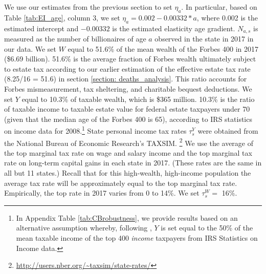 \documentclass[12pt]{article}
\begin{document}
We use our estimates from the previous section to set ${\eta_a}$. 
In particular, based on Table \ref{tab:EI_age}, column 3, we set ${\eta_a} = 0.002 - 0.00332*a $, where 0.002 is the estimated intercept and $-0.00332$ is the estimated elasticity age gradient. $N_{a,s}$ is measured as the number of billionaires of age $a$ observed in the state in 2017 in our data. 
We set $W$ equal to 51.6\% of the mean wealth of the Forbes 400 in 2017 (\$6.69 billion). 51.6\% is the average fraction of Forbes wealth ultimately subject to estate tax according to our earlier estimation of the effective estate tax rate (8.25/16 = 51.6) in section \ref{section: deaths_analysis}. This ratio accounts for Forbes mismeasurement, tax sheltering, and charitable bequest deductions. We set $Y$ equal to 10.3\% of taxable wealth, which is \$365 million. 10.3\% is the ratio of taxable income to taxable estate value for federal estate taxpayers under 70 (given that the median age of the Forbes 400 is 65), according to IRS statistics on income data for 2008.\footnote{In Appendix Table \ref{tab:CBrobustness}, we provide results based on an alternative assumption whereby, following \cite{saez-zucman:2019}, $Y$ is set equal to the 50\% of the mean taxable income of the top 400 \textit{income} taxpayers from IRS Statistics on Income data.} 
State personal income tax rates $\tau_s^{Y}$ were obtained from the National Bureau of Economic Research's TAXSIM.
\footnote{\url{http://users.nber.org/~taxsim/state-rates/}} 
We use the average of the top marginal tax rate on wage and salary income and the top marginal tax rate on long-term capital gains in each state in 2017. (These rates are the same in all but 11 states.) Recall that for this high-wealth, high-income population the average tax rate will be approximately equal to the top marginal tax rate. Empirically, the top rate in 2017 varies from 0 to 14\%.  We set $\tau_s^{W}=$ 16\%.
\end{document}

